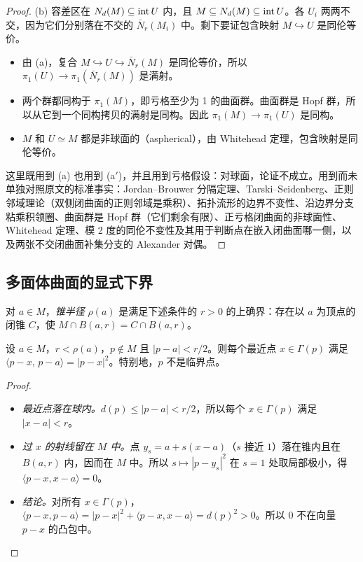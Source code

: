 \begin{proof}
(b) 容差区在 $N_d(M)\subseteq\operatorname{int} U$ 内，且 $M\subseteq N_d(M)\subseteq\operatorname{int} U$。各 $U_i$ 两两不交，因为它们分别落在不交的 $\bar N_r(M_i)$ 中。剩下要证包含映射 $M\hookrightarrow U$ 是同伦等价。
\begin{itemize}
\item 由 (a)，复合 $M\hookrightarrow U\hookrightarrow\bar N_r(M)$ 是同伦等价，所以 $\pi_1(U)\to\pi_1(\bar N_r(M))$ 是满射。
\item 两个群都同构于 $\pi_1(M)$，即亏格至少为 1 的曲面群。曲面群是 Hopf 群，所以从它到一个同构拷贝的满射是同构。因此 $\pi_1(M)\to\pi_1(U)$ 是同构。
\item $M$ 和 $U\simeq M$ 都是非球面的（aspherical），由 Whitehead 定理，包含映射是同伦等价。
\end{itemize}
这里既用到 (a) 也用到 (a$'$)，并且用到亏格假设：对球面，论证不成立。用到而未单独对照原文的标准事实：Jordan--Brouwer 分隔定理、Tarski--Seidenberg、正则邻域理论（双侧闭曲面的正则邻域是乘积）、拓扑流形的边界不变性、沿边界分支粘乘积领圈、曲面群是 Hopf 群（它们剩余有限）、正亏格闭曲面的非球面性、Whitehead 定理、模 2 度的同伦不变性及其用于判断点在嵌入闭曲面哪一侧，以及两张不交闭曲面补集分支的 Alexander 对偶。
\end{proof}

\subsection{多面体曲面的显式下界}
对 $a\in M$，\emph{锥半径} $\rho(a)$ 是满足下述条件的 $r>0$ 的上确界：存在以 $a$ 为顶点的闭锥 $C$，使 $M\cap B(a,r)=C\cap B(a,r)$。

\begin{lemma}[锥引理]\label{lem:cone}
设 $a\in M$，$r<\rho(a)$，$p\notin M$ 且 $|p-a|<r/2$。则每个最近点 $x\in\Gamma(p)$ 满足 $\langle p-x,\,p-a\rangle=|p-x|^2$。特别地，$p$ 不是临界点。
\end{lemma}
\begin{proof}
\begin{itemize}
\item \emph{最近点落在球内。}$d(p)\le|p-a|<r/2$，所以每个 $x\in\Gamma(p)$ 满足 $|x-a|<r$。
\item \emph{过 $x$ 的射线留在 $M$ 中。}点 $y_s=a+s(x-a)$（$s$ 接近 $1$）落在锥内且在 $B(a,r)$ 内，因而在 $M$ 中。所以 $s\mapsto|p-y_s|^2$ 在 $s=1$ 处取局部极小，得 $\langle p-x,x-a\rangle=0$。
\item \emph{结论。}对所有 $x\in\Gamma(p)$，$\langle p-x,p-a\rangle=|p-x|^2+\langle p-x,x-a\rangle=d(p)^2>0$。所以 $0$ 不在向量 $p-x$ 的凸包中。
\end{itemize}
\end{proof}


